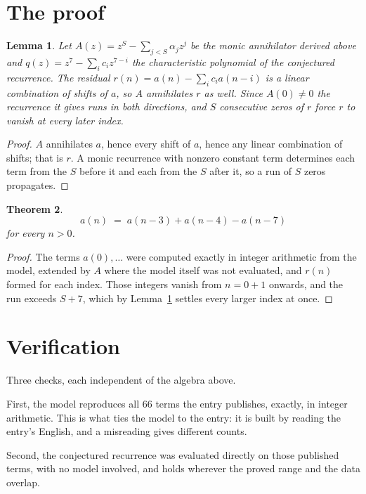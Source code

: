 \documentclass[11pt,a4paper]{article}
\theoremstyle{plain}
\newtheorem{theorem}{Theorem}
\newtheorem{lemma}[theorem]{Lemma}
\theoremstyle{definition}
\begin{document}
\section{The proof}

\begin{lemma}\label{lem:crit}
Let $A(z)=z^S-\sum_{j<S}\alpha_jz^{j}$ be the monic annihilator derived above and
$q(z)=z^{7}-\sum_ic_iz^{7-i}$ the characteristic polynomial of the conjectured
recurrence. The residual $r(n)=a(n)-\sum_ic_ia(n-i)$ is a linear combination of shifts of $a$,
so $A$ annihilates $r$ as well. Since $A(0)\ne0$ the recurrence it gives runs in both
directions, and $S$ consecutive zeros of $r$ force $r$ to vanish at every later index.
\end{lemma}

\begin{proof}
$A$ annihilates $a$, hence every shift of $a$, hence any linear combination of shifts; that is
$r$. A monic recurrence with nonzero constant term determines each term from the $S$ before it
and each from the $S$ after it, so a run of $S$ zeros propagates.
\end{proof}

\begin{theorem}
\[
a(n)\;=\;a(n-3) + a(n-4) - a(n-7)
\]
for every $n>0$.
\end{theorem}

\begin{proof}
The terms $a(0),\dots$ were computed exactly in integer arithmetic from the model, extended by
$A$ where the model itself was not evaluated, and $r(n)$ formed for each index. Those integers
vanish from $n=0+1$ onwards, and the run exceeds $S+7$, which by
Lemma~\ref{lem:crit} settles every larger index at once.
\end{proof}

\section{Verification}

Three checks, each independent of the algebra above.

First, the model reproduces all $66$ terms the entry publishes, exactly, in integer
arithmetic. This is what ties the model to the entry: it is built by reading the entry's
English, and a misreading gives different counts.

Second, the conjectured recurrence was evaluated directly on those published terms, with no
model involved, and holds wherever the proved range and the data overlap.
\end{document}

